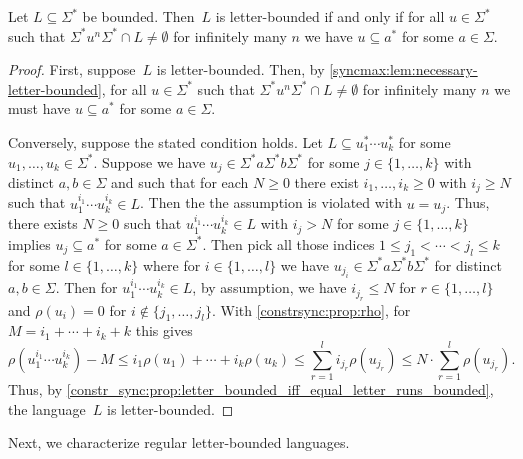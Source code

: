 \begin{proposition} \label{syncmax:lem:non-letter-bounded}
	Let $L \subseteq \Sigma^*$ be bounded.
	Then~$L$ is letter-bounded 
	if and only if for all $u \in \Sigma^*$
	such that $\Sigma^* u^n \Sigma^* \cap L \ne \emptyset$ for infinitely many $n$
	we have $u \subseteq a^*$ for some $a \in \Sigma$.
\end{proposition}
\begin{proof}
	First, suppose~$L$ is letter-bounded. Then, by \cref{syncmax:lem:necessary-letter-bounded},
	for all $u \in \Sigma^*$ such that $\Sigma^* u^n \Sigma^* \cap L \ne \emptyset$ for infinitely many $n$
	we must have $u \subseteq a^*$ for some $a \in \Sigma$.
	
	Conversely, suppose the stated condition holds.
	Let $L \subseteq u_1^* \cdots u_k^*$ for some $u_1, \ldots, u_k \in \Sigma^*$. 
	Suppose we have $u_j \in \Sigma^* a \Sigma^* b \Sigma^*$ for some $j \in \{1,\ldots,k\}$
	with distinct $a,b \in \Sigma$
	and such that for each $N \ge 0$
	there exist $i_1, \ldots, i_k \ge 0$ with $i_j \ge N$
	such that $u_1^{i_1} \cdots u_k^{i_k} \in L$. Then the the assumption is violated
	with $u = u_j$.	
	Thus, there exists $N \ge 0$
	such that $u_1^{i_1} \cdots u_k^{i_k} \in L$
	with $i_j > N$ for some $j \in \{1,\ldots,k\}$
	implies $u_{j} \subseteq a^*$ for some $a \in \Sigma^*$.
	Then pick all those indices $1 \le j_1 < \cdots < j_l \le k$ for some $l \in \{1,\ldots,k\}$
	where for $i \in \{1,\ldots,l\}$ we have $u_{j_i} \in \Sigma^* a \Sigma^* b \Sigma^*$ for distinct $a,b \in \Sigma$.
	Then for $u_1^{i_1} \cdots u_k^{i_k} \in L$,
	by assumption, we have $i_{j_r} \le N$ for $r \in \{1,\ldots,l\}$
	and $\rho(u_i) = 0$ for $i \notin \{j_1, \ldots, j_l\}$.
	With \cref{constrsync:prop:rho}, for $M =i_1 + \cdots + i_k + k $ this gives
	\[
	\rho( u_1^{i_1} \cdots u_k^{i_k} ) - M
	\le i_1 \rho(u_1) + \cdots + i_k \rho(u_k)
	\le \sum_{r = 1}^l i_{j_r} \rho(u_{j_r}) 
	\le N \cdot \sum_{r = 1}^l \rho(u_{j_r}).
	\]
	Thus, by \cref{constr_sync:prop:letter_bounded_iff_equal_letter_runs_bounded},
	the language~$L$ is letter-bounded.
\end{proof}

Next, we characterize regular letter-bounded languages.

